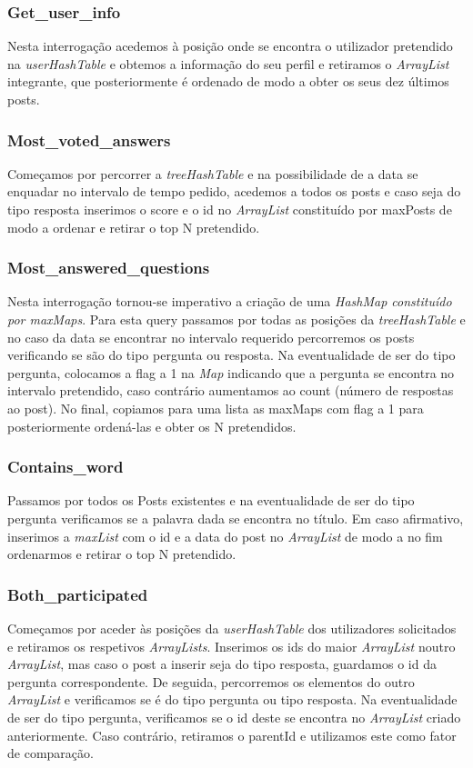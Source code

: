 \documentclass[10pt,a4paper]{article}
\begin{document}
\subsubsection{Get\_user\_info}
Nesta interrogação acedemos à posição onde se encontra o utilizador pretendido na \textit{userHashTable} e obtemos a informação do seu perfil e retiramos o \textit{ArrayList} integrante, que posteriormente é ordenado de modo a obter os seus dez últimos posts.

\subsubsection{Most\_voted\_answers}
Começamos por percorrer a \textit{treeHashTable} e na possibilidade de a data se enquadar no intervalo de tempo pedido, acedemos a todos os posts e caso seja do tipo resposta inserimos o score e o id no \textit{ArrayList} constituído por maxPosts de modo a ordenar e retirar o top N pretendido.

\subsubsection{Most\_answered\_questions}
Nesta interrogação tornou-se imperativo a criação de uma \textit{HashMap constituído por maxMaps}.
Para esta query passamos por todas as posições da \textit{treeHashTable} e no caso da data se encontrar no intervalo requerido percorremos os posts verificando se são do tipo pergunta ou resposta. Na eventualidade de ser do tipo pergunta, colocamos a flag a 1 na \textit{Map} indicando que a pergunta se encontra no intervalo pretendido, caso contrário aumentamos ao count (número de respostas ao post). No final, copiamos para uma lista as maxMaps com flag a 1 para posteriormente ordená-las e obter os N pretendidos.

\subsubsection{Contains\_word} 
Passamos por todos os Posts existentes e na eventualidade de ser do tipo pergunta verificamos se a palavra dada se encontra no título. Em caso afirmativo, inserimos a \textit{maxList} com o id e a data do post no \textit{ArrayList} de modo a no fim ordenarmos e retirar o top N pretendido.

\subsubsection{Both\_participated} 
Começamos por aceder às posições da \textit{userHashTable} dos utilizadores solicitados e retiramos os respetivos \textit{ArrayLists}. Inserimos os ids do maior \textit{ArrayList} noutro \textit{ArrayList}, mas caso o post a inserir seja do tipo resposta, guardamos o id da pergunta correspondente. De seguida, percorremos os elementos do outro \textit{ArrayList} e verificamos se é do tipo pergunta ou tipo resposta. Na eventualidade de ser do tipo pergunta, verificamos se o id deste se encontra no \textit{ArrayList} criado anteriormente. Caso contrário, retiramos o parentId e utilizamos este como fator de comparação.
\end{document}

